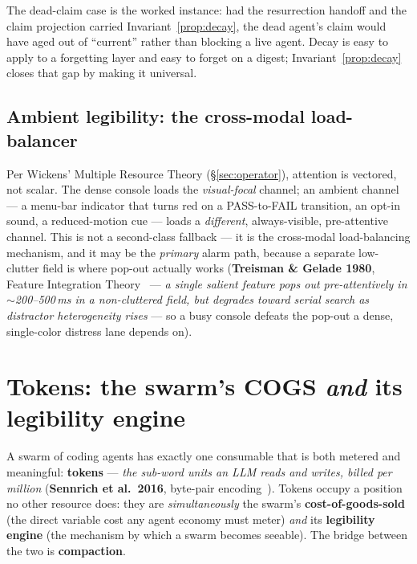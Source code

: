 \documentclass[11pt,a4paper]{article}
\theoremstyle{definition}
\theoremstyle{plain}
\begin{document}
The dead-claim case is the worked instance: had the resurrection handoff and the
claim projection carried Invariant~\ref{prop:decay}, the dead agent's claim would have
aged out of ``current'' rather than blocking a live agent. Decay is easy to apply to a
forgetting layer and easy to forget on a digest; Invariant~\ref{prop:decay} closes that
gap by making it universal.

\subsection{Ambient legibility: the cross-modal load-balancer}\label{sec:ambient}

Per Wickens' Multiple Resource Theory (\S\ref{sec:operator}), attention is vectored,
not scalar. The dense console loads the \emph{visual-focal} channel; an ambient
channel --- a menu-bar indicator that turns red on a PASS-to-FAIL transition, an
opt-in sound, a reduced-motion cue --- loads a \emph{different}, always-visible,
pre-attentive channel. This is not a second-class fallback --- it is the cross-modal
load-balancing mechanism, and it may be the \emph{primary} alarm path, because a
separate low-clutter field is where pop-out actually works (\textbf{Treisman \& Gelade
1980}, Feature Integration Theory~ --- \emph{a single salient
feature pops out pre-attentively in $\sim$200--500\,ms in a non-cluttered field, but
degrades toward serial search as distractor heterogeneity rises} --- so a busy console
defeats the pop-out a dense, single-color distress lane depends on).

\pdexercisepointer{\ref{ex:ls-split-ranker-statement}}{\ref{ex:ls-decay-vs-summary}}{\pageref{ex:ls-split-ranker-statement}}

\section{Tokens: the swarm's COGS \emph{and} its legibility engine}\label{sec:tokens}

A swarm of coding agents has exactly one consumable that is both metered and
meaningful: \textbf{tokens} --- \emph{the sub-word units an LLM reads and writes,
billed per million} (\textbf{Sennrich et al.\ 2016}, byte-pair
encoding~). Tokens occupy a position no other resource does: they
are \emph{simultaneously} the swarm's \textbf{cost-of-goods-sold} (the direct
variable cost any agent economy must meter) \emph{and} its \textbf{legibility engine}
(the mechanism by which a swarm becomes seeable). The bridge between the two is
\textbf{compaction}.
\end{document}
